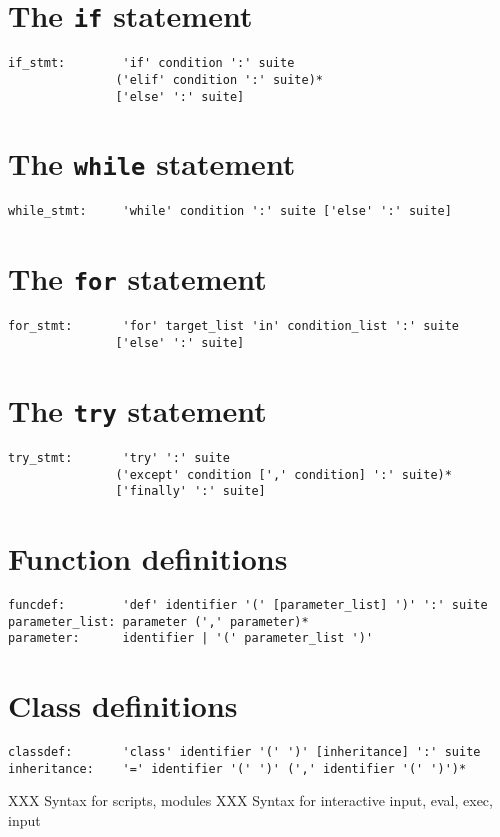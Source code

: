 \section{The {\tt if} statement}

\begin{verbatim}
if_stmt:        'if' condition ':' suite
               ('elif' condition ':' suite)*
               ['else' ':' suite]
\end{verbatim}

\section{The {\tt while} statement}

\begin{verbatim}
while_stmt:     'while' condition ':' suite ['else' ':' suite]
\end{verbatim}

\section{The {\tt for} statement}

\begin{verbatim}
for_stmt:       'for' target_list 'in' condition_list ':' suite
               ['else' ':' suite]
\end{verbatim}

\section{The {\tt try} statement}

\begin{verbatim}
try_stmt:       'try' ':' suite
               ('except' condition [',' condition] ':' suite)*
               ['finally' ':' suite]
\end{verbatim}

\section{Function definitions}

\begin{verbatim}
funcdef:        'def' identifier '(' [parameter_list] ')' ':' suite
parameter_list: parameter (',' parameter)*
parameter:      identifier | '(' parameter_list ')'
\end{verbatim}

\section{Class definitions}

\begin{verbatim}
classdef:       'class' identifier '(' ')' [inheritance] ':' suite
inheritance:    '=' identifier '(' ')' (',' identifier '(' ')')*
\end{verbatim}

XXX Syntax for scripts, modules
XXX Syntax for interactive input, eval, exec, input


